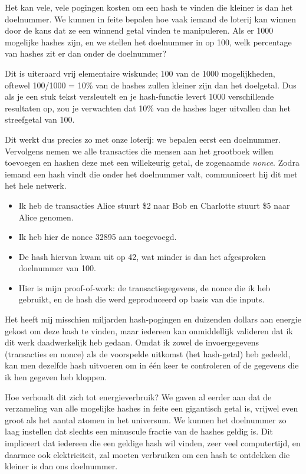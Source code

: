 Het kan vele, vele pogingen kosten om een hash te vinden die kleiner is dan het doelnummer. We kunnen in feite bepalen hoe vaak iemand de loterij kan winnen door de kans dat ze een winnend getal vinden te manipuleren. Als er 1000 mogelijke hashes zijn, en we stellen het doelnummer in op 100, welk percentage van hashes zit er dan onder de doelnummer?

Dit is uiteraard vrij elementaire wiskunde; 100 van de 1000 mogelijkheden, oftewel 100/1000 = 10\% van de hashes zullen kleiner zijn dan het doelgetal. Dus als je een stuk tekst versleutelt en je hash-functie levert 1000 verschillende resultaten op, zou je verwachten dat 10\% van de hashes lager uitvallen dan het streefgetal van 100.

Dit werkt dus precies zo met onze loterij: we bepalen eerst een doelnummer. Vervolgens nemen we alle transacties die mensen aan het grootboek willen toevoegen en hashen deze met een willekeurig getal, de zogenaamde \textit{nonce}. Zodra iemand een hash vindt die onder het doelnummer valt, communiceert hij dit met het hele netwerk.

\begin{itemize}
    \item Ik heb de transacties \textquotedbl{}Alice stuurt \$2 naar Bob\textquotedbl{} en \textquotedbl{}Charlotte stuurt \$5 naar Alice\textquotedbl{} genomen.
    \item Ik heb hier de nonce \textquotedbl{}32895\textquotedbl{} aan toegevoegd. 
    \item De hash hiervan kwam uit op 42, wat minder is dan het afgesproken doelnummer van 100.
    \item Hier is mijn proof-of-work: de transactiegegevens, de nonce die ik heb gebruikt, en de hash die werd geproduceerd op basis van die inputs.
\end{itemize}

Het heeft mij misschien miljarden hash-pogingen en duizenden dollars aan energie gekost om deze hash te vinden, maar iedereen kan onmiddellijk valideren dat ik dit werk daadwerkelijk heb gedaan. Omdat ik zowel de invoergegevens (transacties en nonce) als de voorspelde uitkomst (het hash-getal) heb gedeeld, kan men dezelfde hash uitvoeren om in één keer te controleren of de gegevens die ik hen gegeven heb kloppen.

Hoe verhoudt dit zich tot energieverbruik? We gaven al eerder aan dat de verzameling van alle mogelijke hashes in feite een gigantisch getal is, vrijwel even groot als het aantal atomen in het universum. We kunnen het doelnummer zo laag instellen dat slechts een minuscule fractie van de hashes geldig is. Dit impliceert dat iedereen die een geldige hash wil vinden, zeer veel computertijd, en daarmee ook elektriciteit, zal moeten verbruiken om een hash te ontdekken die kleiner is dan ons doelnummer.

